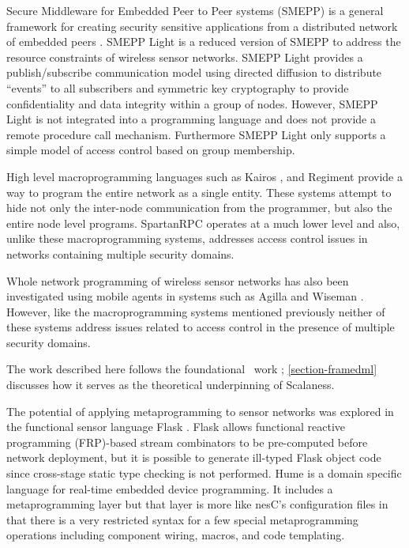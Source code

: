 Secure Middleware for Embedded Peer to Peer systems (SMEPP) is a general framework for creating
security sensitive applications from a distributed network of embedded peers
\cite{Brogi:2008:SME:1363370.1363548}. SMEPP Light \cite{Vairo:2008:SMW:1594978.1595054} is a
reduced version of SMEPP to address the resource constraints of wireless sensor networks. SMEPP
Light provides a publish/subscribe communication model using directed diffusion
\cite{intanagonwiwat-2003} to distribute ``events'' to all subscribers and symmetric key
cryptography to provide confidentiality and data integrity within a group of nodes. However,
SMEPP Light is not integrated into a programming language and does not provide a remote
procedure call mechanism. Furthermore SMEPP Light only supports a simple model of access control
based on group membership.

High level macro\-programming languages such as Kairos \cite{springerlink:10.1007/1150259312},
and Regiment \cite{Newton:2007:RMS:1236360.1236422} provide a way to program the entire network
as a single entity. These systems attempt to hide not only the inter-node communication from the
programmer, but also the entire node level programs. SpartanRPC operates at a much lower level
and also, unlike these macro\-programming systems, addresses access control issues in networks
containing multiple security domains.

Whole network programming of wireless sensor networks has also been investigated using mobile
agents in systems such as Agilla \cite{Fok:2009:AMA:1552297.1552299} and Wiseman
\cite{Gonzalez-Valenzuela:2010:PMW:1891545.1891566}. However, like the macro\-programming
systems mentioned previously neither of these systems address issues related to access control
in the presence of multiple security domains.


The work described here follows the foundational \fml\ work \cite{FramedML};
\autoref{section-framedml} discusses how it serves as the theoretical underpinning of Scalaness.

The potential of applying metaprogramming to sensor networks was explored in the functional
sensor language Flask \cite{Mainland-Flask-2008}. Flask allows functional reactive programming
(FRP)-based stream combinators to be pre-computed before network deployment, but it is possible
to generate ill-typed Flask object code since cross-stage static type checking is not performed.
Hume \cite{Hume} is a domain specific language for real-time embedded device programming. It
includes a metaprogramming layer but that layer is more like nesC's configuration files in that
there is a very restricted syntax for a few special metaprogramming operations including
component wiring, macros, and code templating.


